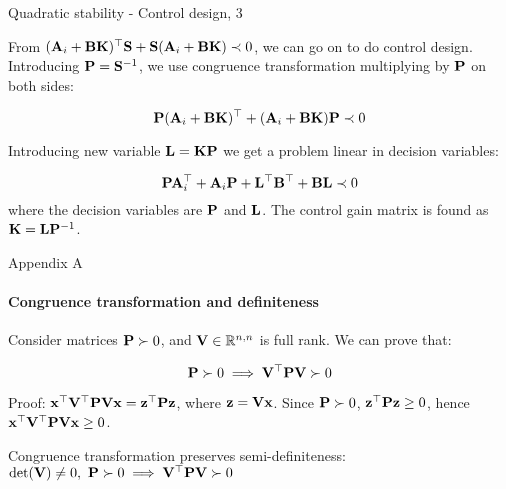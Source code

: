 \documentclass{beamer}
\begin{document}
	
	
	\begin{frame}{Quadratic stability - Control design, 3}
		\begin{flushleft}
			
			From $(\mathbf{A}_i + \mathbf{B}\mathbf{K})^\top \mathbf{S} +
			\mathbf{S} (\mathbf{A}_i + \mathbf{B}\mathbf{K}) \prec 0$, we can go on to do control design. Introducing $\mathbf{P} = \mathbf{S}^{-1}$, we use congruence transformation multiplying by $\mathbf{P}$ on both sides:
			
			\begin{equation}
				\mathbf{P}(\mathbf{A}_i + \mathbf{B}\mathbf{K})^\top  +
				(\mathbf{A}_i + \mathbf{B}\mathbf{K})\mathbf{P} \prec 0
			\end{equation}
			
			Introducing new variable $\mathbf{L} = \mathbf{K} \mathbf{P}$ we get a problem linear in decision variables:
			
			\begin{equation}
				\mathbf{P}\mathbf{A}_i^\top + \mathbf{A}_i \mathbf{P} +
				\mathbf{L}^\top\mathbf{B}^\top + \mathbf{B}\mathbf{L} \prec 0
			\end{equation}		
			where the decision variables are $\mathbf{P}$ and $\mathbf{L}$. The control gain matrix is found as $\mathbf{K} = \mathbf{L} \mathbf{P}^{-1}$.
			
		\end{flushleft}
	\end{frame}
	
	
	
\myqrframe
	
	
	
	
	\begin{frame}{Appendix A}
		\framesubtitle{Congruence transformation and definiteness}
		\begin{flushleft}
			
			Consider matrices $\mathbf{P} \succ 0$, and $\mathbf{V} \in \mathbb{R}^{n, n}$ is full rank. We can prove that:
			
			\begin{equation}
				\mathbf{P} \succ 0 \implies \mathbf{V}^\top\mathbf{P}\mathbf{V} \succ 0
			\end{equation}
			
			Proof: $\mathbf{x}^\top\mathbf{V}^\top\mathbf{P}\mathbf{V}\mathbf{x} = \mathbf{z}^\top\mathbf{P}\mathbf{z}$, where $\mathbf{z} = \mathbf{V}\mathbf{x}$. Since $\mathbf{P} \succ 0$, $\mathbf{z}^\top\mathbf{P}\mathbf{z} \geq 0$, hence $\mathbf{x}^\top\mathbf{V}^\top\mathbf{P}\mathbf{V}\mathbf{x} \geq 0$. 
			
			\begin{definition}
				Congruence transformation preserves semi-definiteness: $\text{det}(\mathbf{V}) \neq 0, \ \mathbf{P} \succ 0 \implies \mathbf{V}^\top\mathbf{P}\mathbf{V} \succ 0$
			\end{definition}
			
			
		\end{flushleft}
	\end{frame}
	
	
	
	
\end{document}
